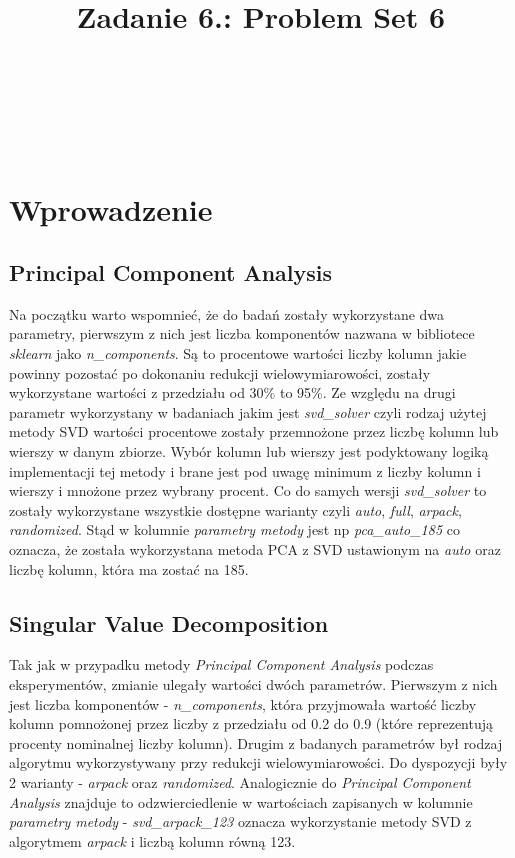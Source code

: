 \documentclass{classrep}
\author{%
    \studentinfo[239661@edu.p.lodz.pl]{Szymon Gruda}{239661}\\
    \studentinfo[239671@edu.p.lodz.pl]{Jan Karwowski}{239671}\\
    \studentinfo[239673@edu.p.lodz.pl]{Michał Kidawa}{239673}\\
    \studentinfo[239676@edu.p.lodz.pl]{Kamil Kowalewski}{239676}\\
}
\title{Zadanie 6.: Problem Set 6}
\begin{document}
    \maketitle
    \thispagestyle{fancyplain}

    \newpage
    \tableofcontents
    \newpage

    \section{Wprowadzenie}
    \label{intro} {

        \subsection{Principal Component Analysis} {
            Na początku warto wspomnieć, że do badań zostały wykorzystane dwa parametry,
            pierwszym z nich jest liczba komponentów nazwana w bibliotece
            \textit{sklearn} jako \textit{n\_components}. Są to procentowe wartości
            liczby kolumn jakie powinny pozostać po dokonaniu redukcji
            wielowymiarowości, zostały wykorzystane wartości z przedziału od 30\% to 95\%.
            Ze względu na drugi parametr wykorzystany w badaniach jakim jest
            \textit{svd\_solver} czyli rodzaj użytej metody SVD wartości procentowe
            zostały przemnożone przez liczbę kolumn lub wierszy w danym zbiorze. Wybór
            kolumn lub wierszy jest podyktowany logiką implementacji tej metody i brane
            jest pod uwagę minimum z liczby kolumn i wierszy i mnożone przez wybrany
            procent. Co do samych wersji \textit{svd\_solver} to zostały wykorzystane
            wszystkie dostępne warianty czyli \textit{auto}, \textit{full},
            \textit{arpack}, \textit{randomized}. Stąd w kolumnie
            \textit{parametry metody} jest np \textit{pca\_auto\_185} co oznacza, że
            została wykorzystana metoda PCA z SVD ustawionym na \textit{auto} oraz liczbę
            kolumn, która ma zostać na 185.
        }
        \subsection{Singular Value Decomposition} {
            Tak jak w przypadku metody \textit{Principal Component Analysis} podczas
            eksperymentów, zmianie ulegały wartości dwóch parametrów. Pierwszym z nich
            jest liczba komponentów - \textit{n\_components}, która przyjmowała wartość
            liczby kolumn pomnożonej przez liczby z przedziału od 0.2 do 0.9 (które
            reprezentują procenty nominalnej liczby kolumn). Drugim z badanych
            parametrów był rodzaj algorytmu wykorzystywany przy redukcji
            wielowymiarowości. Do dyspozycji były 2 warianty - \textit{arpack} oraz
            \textit{randomized}. Analogicznie do \textit{Principal Component Analysis}
            znajduje to odzwierciedlenie w wartościach zapisanych w kolumnie
            \textit{parametry metody} - \textit{svd\_arpack\_123} oznacza wykorzystanie
            metody SVD z algorytmem \textit{arpack} i liczbą kolumn równą 123.
        }
}
\end{document}
